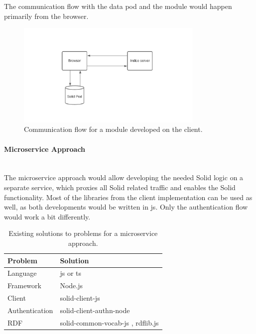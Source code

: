 The communication flow with the data pod and the module would happen primarily from the browser.

\begin{figure}[H]
    \centering
    \includegraphics[width=0.8\textwidth]{prototype/graphs/poc-infrastructure-frontend.jpeg}
    \caption{Communication flow for a module developed on the client.}
    \label{fig:poc-infrastructure-frontend}
\end{figure}
\vspace{0.5cm}
\paragraph{Microservice Approach}\label{microservice-approach}\mbox{}\\

The microservice approach would allow developing the needed Solid logic on a separate service, which proxies all Solid related traffic and enables the Solid functionality. Most of the libraries from the client implementation can be used as well, as both developments would be written in \gls{js}. Only the authentication flow would work a bit differently.

\begin{table}[h!]
    \centering
    \begin{tabular}{| l | l |} 
    \hline
     Problem & Solution \\
     \hline
      Language & \gls{js} or \gls{ts}  \\
      Framework & Node.js  \\
      Client & solid-client-js \cite{solid-client-js}  \\
      Authentication & solid-client-authn-node \cite{solid-client-authn-node} \\
      RDF & solid-common-vocab-js \cite{solid-common-vocab-js}, rdflib.js \cite{rdflib-js}  \\
    \hline
    \end{tabular}
    \vspace{0.75cm}
    \caption{Existing solutions to problems for a microservice approach.}
    \label{table:2}
\end{table}

